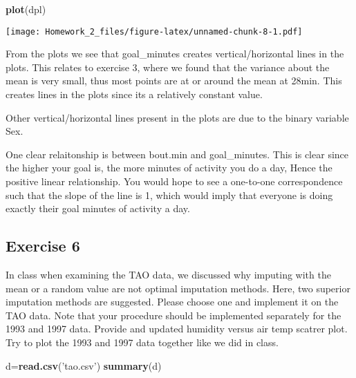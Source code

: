 \documentclass[]{article}
\newenvironment{Shaded}{\begin{snugshade}}{\end{snugshade}}
\newcommand{\KeywordTok}[1]{\textcolor[rgb]{0.13,0.29,0.53}{\textbf{#1}}}
\newcommand{\StringTok}[1]{\textcolor[rgb]{0.31,0.60,0.02}{#1}}
\newcommand{\NormalTok}[1]{#1}
\begin{document}
\begin{Shaded}
\begin{Highlighting}[]
\KeywordTok{plot}\NormalTok{(dpl)}
\end{Highlighting}
\end{Shaded}

\texttt{[image: Homework\_2\_files/figure-latex/unnamed-chunk-8-1.pdf]}

From the plots we see that goal\_minutes creates vertical/horizontal
lines in the plots. This relates to exercise 3, where we found that the
variance about the mean is very small, thus most points are at or around
the mean at 28min. This creates lines in the plots since its a
relatively constant value.

Other vertical/horizontal lines present in the plots are due to the
binary variable Sex.

One clear relaitonship is between bout.min and goal\_minutes. This is
clear since the higher your goal is, the more minutes of activity you do
a day, Hence the positive linear relationship. You would hope to see a
one-to-one correspondence such that the slope of the line is 1, which
would imply that everyone is doing exactly their goal minutes of
activity a day.

\subsection{Exercise 6}\label{exercise-6}

In class when examining the TAO data, we discussed why imputing with the
mean or a random value are not optimal imputation methods. Here, two
superior imputation methods are suggested. Please choose one and
implement it on the TAO data. Note that your procedure should be
implemented separately for the 1993 and 1997 data. Provide and updated
humidity versus air temp scatrer plot. Try to plot the 1993 and 1997
data together like we did in class.

\begin{Shaded}
\begin{Highlighting}[]
\NormalTok{d=}\KeywordTok{read.csv}\NormalTok{(}\StringTok{'tao.csv'}\NormalTok{)}
\KeywordTok{summary}\NormalTok{(d)}
\end{Highlighting}
\end{Shaded}
\end{document}
